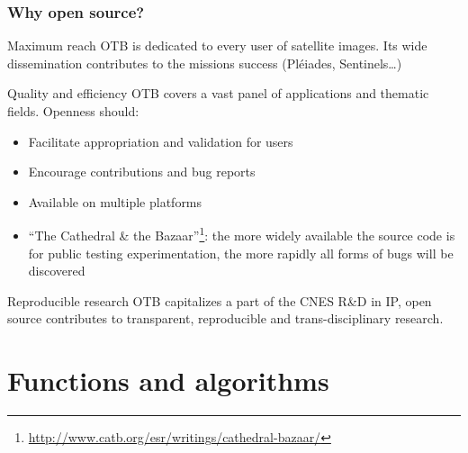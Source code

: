 \documentclass[8pt]{beamer}
\begin{document}
\begin{frame}
\frametitle{Why open source?}

\begin{block}{Maximum reach}
OTB is dedicated to every user of satellite images. Its wide
dissemination contributes to the missions success (Pléiades, Sentinels\ldots)
\end{block}

\begin{block}{Quality and efficiency}
OTB covers a vast panel of applications and thematic fields. Openness should:
\begin{itemize}
\item Facilitate appropriation and validation for users
\item Encourage contributions and bug reports
\item Available on multiple platforms
\item ``The Cathedral \& the
  Bazaar''\footnote{\url{http://www.catb.org/esr/writings/cathedral-bazaar/}}: the more widely available the source code is for public testing
  experimentation, the more rapidly all forms of bugs will be discovered
\end{itemize}
\end{block}

\begin{block}{Reproducible research}
OTB capitalizes a part of the CNES R\&D in IP, open source contributes to  transparent, \alert{reproducible} and trans-disciplinary \alert{research}.
\end{block}

\end{frame}

\section{Functions and algorithms}
\end{document}
